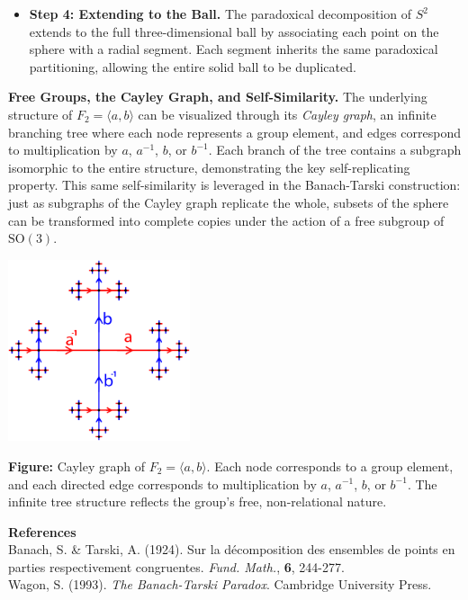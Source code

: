 \begin{technical}
\begin{itemize}[leftmargin=*]
    \item \textbf{Step 4: Extending to the Ball.} 
    The paradoxical decomposition of \( S^2 \) extends to the full three-dimensional ball by associating each point on the sphere with a radial segment. Each segment inherits the same paradoxical partitioning, allowing the entire solid ball to be duplicated.
\end{itemize}
\columnbreak
\textbf{Free Groups, the Cayley Graph, and Self-Similarity.}  
The underlying structure of \( F_2 = \langle a, b \rangle \) can be visualized through its \emph{Cayley graph}, an infinite branching tree where each node represents a group element, and edges correspond to multiplication by \( a \), \( a^{-1} \), \( b \), or \( b^{-1} \). Each branch of the tree contains a subgraph isomorphic to the entire structure, demonstrating the key self-replicating property. This same self-similarity is leveraged in the Banach-Tarski construction: just as subgraphs of the Cayley graph replicate the whole, subsets of the sphere can be transformed into complete copies under the action of a free subgroup of \(\mathrm{SO}(3)\).

\begin{center}
\includegraphics[width=0.4\textwidth]{01_BanachTarskiParadox/F2_Cayley_Graph_tp.png}

\vspace{0.5em}
\small
\textbf{Figure:} Cayley graph of \( F_2 = \langle a, b \rangle \). Each node corresponds to a group element, and each directed edge corresponds to multiplication by \( a \), \( a^{-1} \), \( b \), or \( b^{-1} \). The infinite tree structure reflects the group's free, non-relational nature.
\end{center}


\vspace{0.5em}
\noindent\textbf{References}\\
Banach, S. \& Tarski, A. (1924). Sur la décomposition des ensembles de points en parties respectivement congruentes. \emph{Fund. Math.}, \textbf{6}, 244-277.\\
Wagon, S. (1993). \emph{The Banach-Tarski Paradox}. Cambridge University Press.\\
\end{technical}
